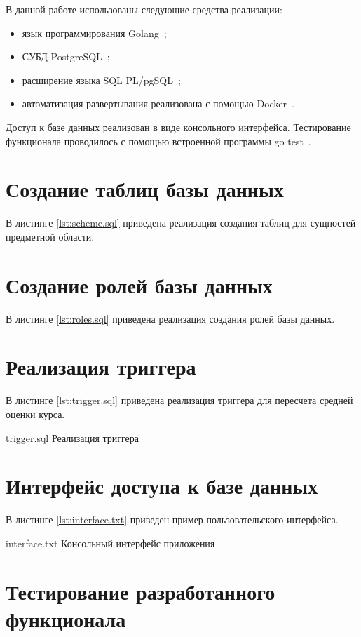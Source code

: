 В данной работе использованы следующие средства реализации:
\begin{itemize}
    \item язык программирования Golang~\cite{go};
    \item СУБД PostgreSQL~\cite{postgres};
    \item расширение языка SQL PL/pgSQL~\cite{pgsql};
    \item автоматизация развертывания реализована с помощью Docker~\cite{docker}.
\end{itemize}

Доступ к базе данных реализован в виде консольного интерфейса. Тестирование функционала проводилось с помощью встроенной программы go test~\cite{go-test}.

\section{Создание таблиц базы данных}

В листинге \ref{lst:scheme.sql} приведена реализация создания таблиц для сущностей предметной области.

\section{Создание ролей базы данных}

В листинге \ref{lst:roles.sql} приведена реализация создания ролей базы данных.

\pagebreak
\section{Реализация триггера}

В листинге \ref{lst:trigger.sql} приведена реализация триггера для пересчета средней оценки курса.

    {trigger.sql}
    {Реализация триггера}

\pagebreak
\section{Интерфейс доступа к базе данных}

В листинге \ref{lst:interface.txt} приведен пример пользовательского интерфейса.

    {interface.txt}
    {Консольный интерфейс приложения}

\section{Тестирование разработанного функционала}

